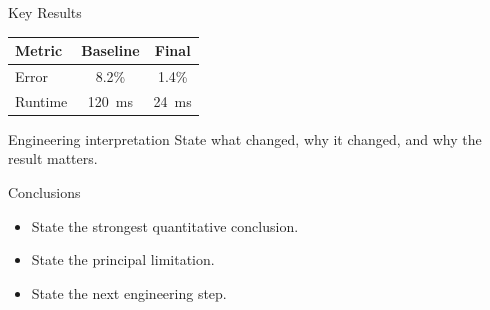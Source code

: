 \documentclass[aspectratio=169]{beamer}
\begin{document}
\begin{frame}{Key Results}
  \begin{table}
    \centering
    \begin{tabular}{lcc}
      \toprule
      Metric & Baseline & Final\\
      \midrule
      Error & 8.2\% & 1.4\%\\
      Runtime & \SI{120}{\milli\second} & \SI{24}{\milli\second}\\
      \bottomrule
    \end{tabular}
  \end{table}
  \begin{alertblock}{Engineering interpretation}
    State what changed, why it changed, and why the result matters.
  \end{alertblock}
\end{frame}

\begin{frame}{Conclusions}
  \begin{itemize}
    \item State the strongest quantitative conclusion.
    \item State the principal limitation.
    \item State the next engineering step.
  \end{itemize}
\end{frame}
\end{document}
